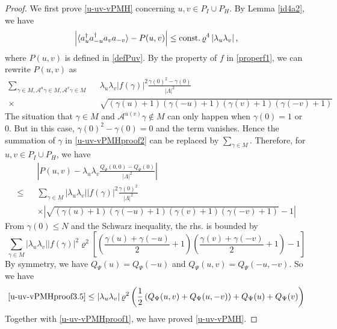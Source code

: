 \documentclass[11pt]{article}
\numberwithin{equation}{section}
\newcommand{\beq}{\begin{equation}}
\newcommand{\eeq}{\end{equation}}
\newcommand{\beqa}{\begin{eqnarray}}
\newcommand{\eeqa}{\end{eqnarray}}
\newcommand\const{{\rm const.\, }}
\renewcommand\rho\varrho
\theoremstyle{definition}
\begin{document}
\begin{proof}
We first prove \eqref{u-uv-vPMH} concerning $u,v\in P_I\cup P_H$.  By  Lemma \ref{id4a2}, we have  
\beq\label{u-uv-vPMHproof1}
\left|\langle a_u^\dagger a_{-u}^\dagger a_va_{-v}\rangle-P(u,v)\right|\leq \const \rho^4\left|\lambda_u\lambda_v\right|,
\eeq
where $P(u,v)$ is defined in \eqref{defPuv}. By the property of $f$ in \eqref{properf1}, we can rewrite $P(u,v)$ as 
\beqa\label{u-uv-vPMHproof2}
\sum_{\gamma\in M, \mathcal A^{u}\gamma\in M, \mathcal A^{v}\gamma\in M}&&\lambda_u\lambda_v|f(\gamma)|^2\frac{\gamma(0)^2-\gamma(0)}{|\Lambda|^2}\\\nonumber
\times&&\sqrt{(\gamma(u)+1)(\gamma(-u)+1)(\gamma(v)+1)(\gamma(-v)+1)}
\eeqa
The situation that $\gamma\in M$ and $\mathcal A^{u(v)}\gamma\notin M$ can only happen when $\gamma(0)=1$ or $0$. But in this case,  $\gamma(0)^2-\gamma(0)=0$ and the term vanishes.  Hence the summation 
of $\gamma$ in \eqref{u-uv-vPMHproof2} can be replaced by $\sum_{\gamma\in M}$. Therefore, 
for  $u,v\in P_I\cup P_H$, we have 
\beqa\label{u-uv-vPMHproof3}
&&\left|P(u,v)-\lambda_u\lambda_v\frac{Q_\Psi(0,0)-Q_\Psi(0)}{|\Lambda|^2}\right|\\\nonumber
\leq&&\sum_{\gamma\in M}\left|\lambda_u\lambda_v\right||f(\gamma)|^2\frac{\gamma(0)^2}{|\Lambda|^2}\\\nonumber
&&\times\left|\sqrt{(\gamma(u)+1)(\gamma(-u)+1)(\gamma(v)+1)(\gamma(-v)+1)}-1\right|
\eeqa
{F}rom  $\gamma(0)\leq N$ and the Schwarz inequality,  the rhs. is bounded by  
\beq\label{u-uv-vPMHproof3.5}
\sum_{\gamma\in M}\left|\lambda_u\lambda_v\right||f(\gamma)|^2\rho^2
\left [ \left( \frac {\gamma(u)+\gamma(-u)}  2+1\right)\left(\frac {\gamma(v)+\gamma(-v)} 2 +1 \right) -1 \right ] 
\eeq
By symmetry, we have $Q_\Psi(u)=Q_\Psi(-u)$ and $Q_\Psi(u,v)=Q_\Psi(-u,-v)$. So we have
\beq
\eqref{u-uv-vPMHproof3.5}\leq\left|\lambda_u\lambda_v\right|\rho^2\left(\frac12\left(Q_\Psi(u,v)+Q_\Psi(u,-v)\right)+Q_\Psi(u)+Q_\Psi(v)\right)
\eeq
Together with \eqref{u-uv-vPMHproof1}, we have proved   \eqref{u-uv-vPMH}.


\end{proof}
\end{document}

